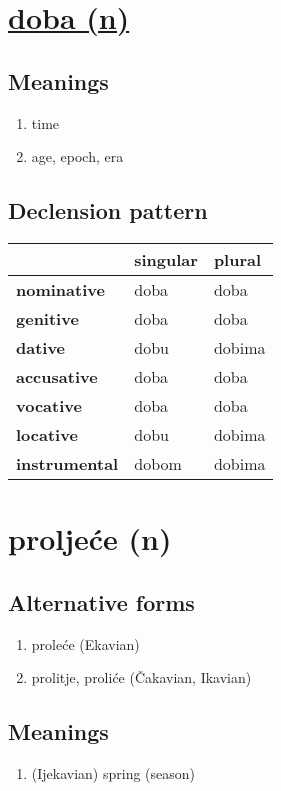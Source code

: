 \filbreak
\section{\underline{doba (n)}}
\subsection*{Meanings}
\begin{enumerate}
\item time
\item age, epoch, era
\end{enumerate}
\subsection*{Declension pattern}
\begin{tabularx}{\linewidth}{Xll}
\toprule
{} & singular &  plural \\
\midrule
\textbf{nominative  } &     doba &    doba \\
\textbf{genitive    } &     doba &    doba \\
\textbf{dative      } &     dobu &  dobima \\
\textbf{accusative  } &     doba &    doba \\
\textbf{vocative    } &     doba &    doba \\
\textbf{locative    } &     dobu &  dobima \\
\textbf{instrumental} &    dobom &  dobima \\
\bottomrule
\end{tabularx}

\filbreak
\section{proljeće (n)}
\subsection*{Alternative forms}
\begin{enumerate}
\item proleće (Ekavian)
\item prolitje, proliće (Čakavian, Ikavian)
\end{enumerate}
\subsection*{Meanings}
\begin{enumerate}
\item (Ijekavian) spring (season)
\end{enumerate}
